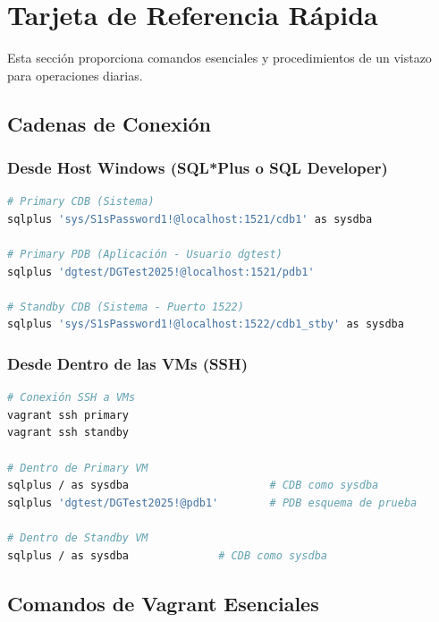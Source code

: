 \documentclass[11pt, a4paper]{report}
\begin{document}
\newpage


\chapter{Tarjeta de Referencia Rápida}

Esta sección proporciona comandos esenciales y procedimientos de un vistazo para operaciones diarias.

\section{Cadenas de Conexión}

\subsection{Desde Host Windows (SQL*Plus o SQL Developer)}

\begin{lstlisting}[language=bash, caption={Conexiones desde Windows Host}]
# Primary CDB (Sistema)
sqlplus 'sys/S1sPassword1!@localhost:1521/cdb1' as sysdba

# Primary PDB (Aplicación - Usuario dgtest)
sqlplus 'dgtest/DGTest2025!@localhost:1521/pdb1'

# Standby CDB (Sistema - Puerto 1522)
sqlplus 'sys/S1sPassword1!@localhost:1522/cdb1_stby' as sysdba
\end{lstlisting}

\subsection{Desde Dentro de las VMs (SSH)}

\begin{lstlisting}[language=bash, caption={Conexiones Locales en VMs}]
# Conexión SSH a VMs
vagrant ssh primary
vagrant ssh standby

# Dentro de Primary VM
sqlplus / as sysdba                      # CDB como sysdba
sqlplus 'dgtest/DGTest2025!@pdb1'        # PDB esquema de prueba

# Dentro de Standby VM
sqlplus / as sysdba              # CDB como sysdba
\end{lstlisting}

\section{Comandos de Vagrant Esenciales}
\end{document}

